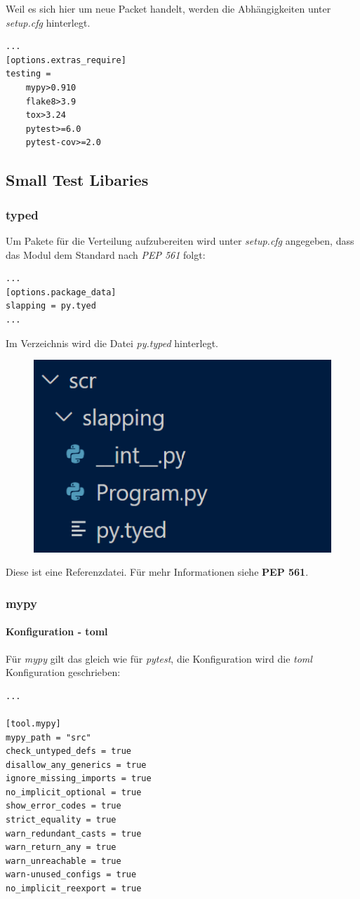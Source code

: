Weil es sich hier um neue Packet handelt, werden die Abhängigkeiten unter \textit{setup.cfg} hinterlegt.
\begin{lstlisting}[style=Config, caption={Bsp. Separate Abhängigkeiten für Tests}, captionpos=b]
...
[options.extras_require]
testing = 
	mypy>0.910
	flake8>3.9
	tox>3.24
	pytest>=6.0
	pytest-cov>=2.0
\end{lstlisting}

\subsection{Small Test Libaries}
\subsubsection{typed}
Um Pakete für die Verteilung aufzubereiten wird unter \textit{setup.cfg} angegeben, dass das Modul dem Standard nach \textit{PEP 561} folgt:
\begin{lstlisting}[style=Config]
...
[options.package_data]
slapping = py.tyed
...
\end{lstlisting}
Im Verzeichnis wird die Datei \textit{py.typed} hinterlegt.
\begin{figure}[H]
	\centering
	\includegraphics[scale = 0.6]{attachment/chapter_2/Scc075}
\end{figure}
Diese ist eine Referenzdatei. Für mehr Informationen siehe \textbf{PEP 561}.

\subsubsection{mypy}
\paragraph{Konfiguration - toml} Für \textit{mypy} gilt das gleich wie für \textit{pytest}, die Konfiguration wird die \textit{toml} Konfiguration geschrieben:
\begin{lstlisting}[style=Config]
...

[tool.mypy]
mypy_path = "src"
check_untyped_defs = true
disallow_any_generics = true
ignore_missing_imports = true
no_implicit_optional = true
show_error_codes = true
strict_equality = true
warn_redundant_casts = true
warn_return_any = true
warn_unreachable = true
warn-unused_configs = true
no_implicit_reexport = true
\end{lstlisting}

